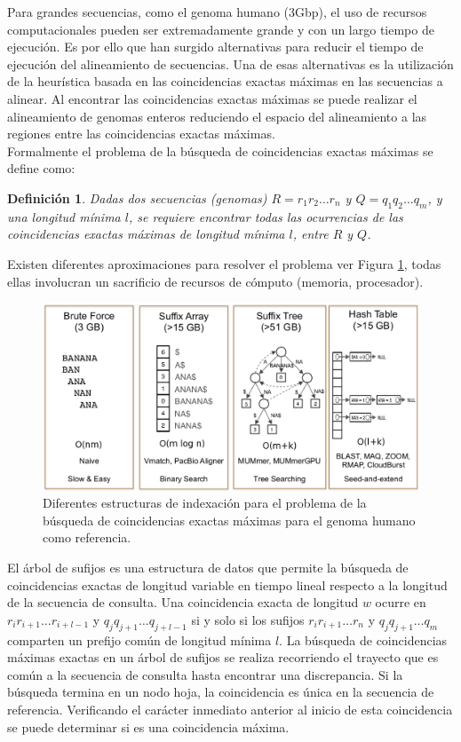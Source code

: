 \documentclass[12pt,a4paper]{article}
\newtheorem{mydef}{Definición}
\begin{document}
\indent
Para grandes secuencias, como el genoma humano (3Gbp), el uso de recursos computacionales pueden ser extremadamente grande y con un largo tiempo de ejecución. Es por ello que han surgido alternativas para reducir el tiempo de ejecución del alineamiento de secuencias. Una de esas alternativas es la utilización de la heurística basada en las coincidencias exactas máximas en las secuencias a alinear. Al encontrar las coincidencias exactas máximas se puede realizar el alineamiento de genomas enteros reduciendo el espacio del alineamiento a las regiones entre las coincidencias exactas máximas.\\
\indent
Formalmente el problema de la búsqueda de coincidencias exactas máximas se define como:
\begin{mydef}
  Dadas dos secuencias (genomas) $R=r_{1}r_{2}\hdots r_{n}$ y $Q=q_{1}q_{2}\hdots q_{m}$, y una longitud mínima $l$, se requiere encontrar todas las ocurrencias de las coincidencias exactas máximas de longitud mínima $l$, entre $R$ y $Q$.
\end{mydef}
Existen diferentes aproximaciones para resolver el problema ver Figura \ref{fig:state}, todas ellas involucran un sacrificio de recursos de cómputo (memoria, procesador).
\begin{figure}[h] 
   \centering 
   \includegraphics[scale=0.3]{state.png} 
   \caption{Diferentes estructuras de indexación para el problema de la búsqueda de coincidencias exactas máximas para el genoma humano como referencia.} 
   \label{fig:state} 
 \end{figure}
\indent
El árbol de sufijos es una estructura de datos que permite la b\'usqueda de coincidencias exactas de longitud variable en tiempo lineal respecto a la longitud de la secuencia de consulta. Una coincidencia exacta de longitud $w$ ocurre en $r_{i}r_{i+1}\hdots r_{i+l-1}$ y $q_{j}q_{j+1}\hdots q_{j+l-1}$ si y solo si los sufijos $r_{i}r_{i+1}\hdots r_{n}$ y $q_{j}q_{j+1}\hdots q_{m}$ comparten un prefijo común de longitud mínima $l$. La búsqueda de coincidencias máximas exactas en un árbol de sufijos se realiza recorriendo el trayecto que es común a la secuencia de consulta hasta encontrar una discrepancia. Si la búsqueda termina en un nodo hoja, la coincidencia es única en la secuencia de referencia. Verificando el carácter inmediato anterior al inicio de esta coincidencia se puede determinar si es una coincidencia  máxima.\\
\end{document}
